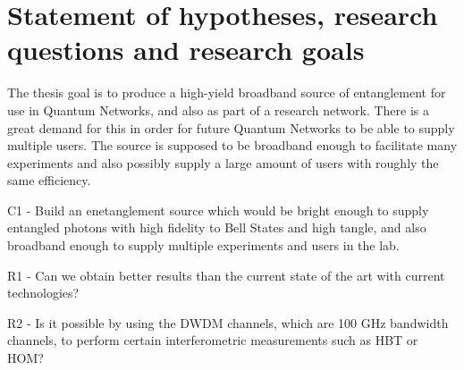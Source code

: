 \documentclass{article}
\theoremstyle{mytheoremstyle}
\theoremstyle{mytheoremstyle}
\theoremstyle{myproblemstyle}
\begin{document}
\section{Statement of hypotheses, research questions and research goals}


The thesis goal is to produce a high-yield broadband source of entanglement for use in
Quantum Networks, and also as part of a research network. There is a great demand for this in order for future 
Quantum Networks to be able to supply multiple users. The source is supposed to be broadband enough to facilitate
many experiments and also possibly supply a large amount of users with roughly the same efficiency.



C1 - Build an enetanglement source which would be bright enough to supply entangled photons with high
fidelity to Bell States and high tangle, and also broadband enough to supply multiple experiments and users in the lab.

R1 - Can we obtain better results than the current state of the art with current technologies?

R2 - Is it possible by using the DWDM channels, which are 100 GHz bandwidth channels, to perform certain interferometric
measurements such as HBT or HOM?
\end{document}
